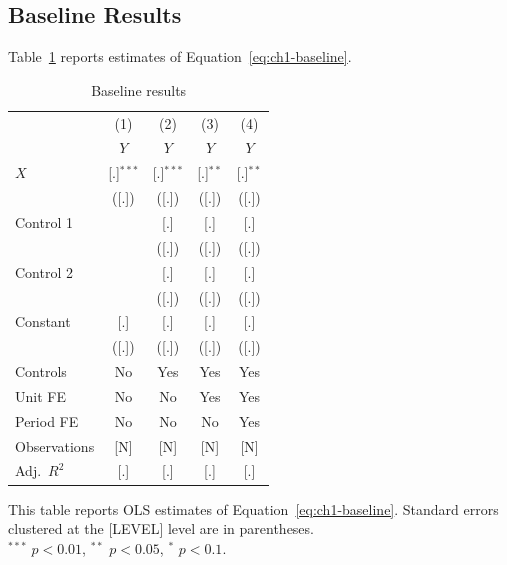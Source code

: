 \documentclass[../main.tex]{subfiles}
\begin{document}
\subsection{Baseline Results}

Table~\ref{tab:ch1-baseline} reports estimates of
Equation~\eqref{eq:ch1-baseline}.

\begin{table}[htbp]
    \centering
    \caption{Baseline results}
    \label{tab:ch1-baseline}
    \begin{tabular}{lcccc}
        \toprule
                     & (1) & (2) & (3) & (4) \\
                     & $Y$ & $Y$ & $Y$ & $Y$ \\
        \midrule
        $X$          & [.]$^{***}$ & [.]$^{***}$ & [.]$^{**}$  & [.]$^{**}$ \\
                     & ([.])       & ([.])       & ([.])       & ([.])      \\
        Control 1    &             & [.]         & [.]         & [.]        \\
                     &             & ([.])       & ([.])       & ([.])      \\
        Control 2    &             & [.]         & [.]         & [.]        \\
                     &             & ([.])       & ([.])       & ([.])      \\
        Constant     & [.]         & [.]         & [.]         & [.]        \\
                     & ([.])       & ([.])       & ([.])       & ([.])      \\
        \midrule
        Controls     & No  & Yes & Yes & Yes \\
        Unit FE      & No  & No  & Yes & Yes \\
        Period FE    & No  & No  & No  & Yes \\
        Observations & [N] & [N] & [N] & [N] \\
        Adj.\ $R^2$  & [.] & [.] & [.] & [.] \\
        \bottomrule
    \end{tabular}

    \vspace{1mm}
    {\footnotesize
    This table reports OLS estimates of Equation~\eqref{eq:ch1-baseline}.
    Standard errors clustered at the [LEVEL] level are in parentheses.\\
    $^{***}$ $p<0.01$, $^{**}$ $p<0.05$, $^{*}$ $p<0.1$.
    }
\end{table}
\end{document}
